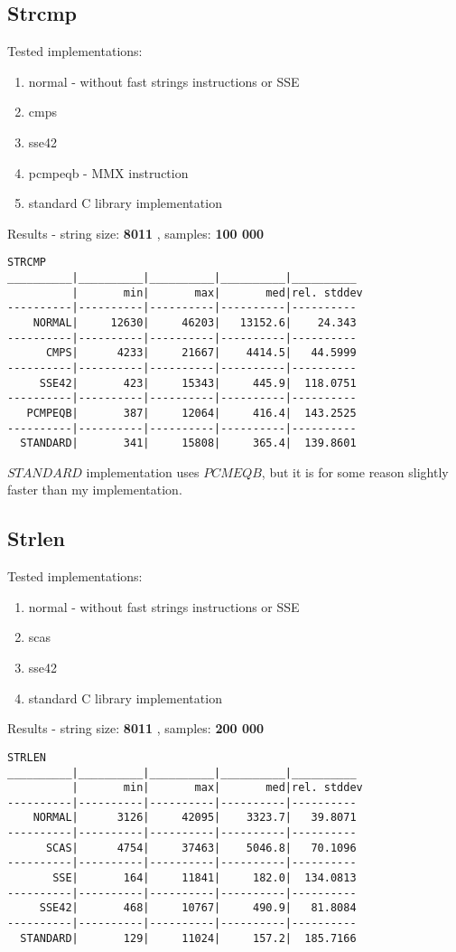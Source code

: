 \documentclass[11pt,a4paper]{article}
\begin{document}
\subsection{Strcmp}\label{subsec:strcmp}
    Tested implementations:
    \begin{enumerate}
        \item normal - without fast strings instructions or SSE
        \item cmps
        \item sse42
        \item pcmpeqb - MMX instruction
        \item standard C library implementation
    \end{enumerate}
Results - string size: \textbf{8011} , samples: \textbf{100 000}
\begin{lstlisting}[]
STRCMP
__________|__________|__________|__________|__________
          |       min|       max|       med|rel. stddev
----------|----------|----------|----------|----------
    NORMAL|     12630|     46203|   13152.6|    24.343
----------|----------|----------|----------|----------
      CMPS|      4233|     21667|    4414.5|   44.5999
----------|----------|----------|----------|----------
     SSE42|       423|     15343|     445.9|  118.0751
----------|----------|----------|----------|----------
   PCMPEQB|       387|     12064|     416.4|  143.2525
----------|----------|----------|----------|----------
  STANDARD|       341|     15808|     365.4|  139.8601
\end{lstlisting}
$STANDARD$ implementation uses $PCMEQB$, but it is for some reason slightly faster than my implementation.



\subsection{Strlen}\label{subsec:strlen}
    Tested implementations:
    \begin{enumerate}
        \item normal - without fast strings instructions or SSE
        \item scas
        \item sse42
        \item standard C library implementation
    \end{enumerate}
Results - string size: \textbf{8011} , samples: \textbf{200 000}
\begin{lstlisting}[]
STRLEN
__________|__________|__________|__________|__________
          |       min|       max|       med|rel. stddev
----------|----------|----------|----------|----------
    NORMAL|      3126|     42095|    3323.7|   39.8071
----------|----------|----------|----------|----------
      SCAS|      4754|     37463|    5046.8|   70.1096
----------|----------|----------|----------|----------
       SSE|       164|     11841|     182.0|  134.0813
----------|----------|----------|----------|----------
     SSE42|       468|     10767|     490.9|   81.8084
----------|----------|----------|----------|----------
  STANDARD|       129|     11024|     157.2|  185.7166
\end{lstlisting}
\end{document}
